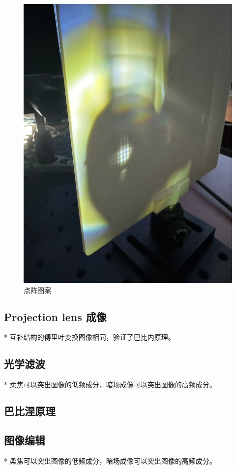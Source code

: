 \documentclass{ctexart}
\begin{document}
\begin{figure}[H]
\begin{minipage}[b]{0.2\textwidth}
    \includegraphics[width=\textwidth]{pictures/微信图片_20241010201031.jpg}
    \caption{点阵图案}
  \end{minipage}
\end{figure}
\subsection{Projection lens 成像}
* 互补结构的傅里叶变换图像相同，验证了巴比内原理。
\subsection{光学滤波}
* 柔焦可以突出图像的低频成分，暗场成像可以突出图像的高频成分。
\subsection{巴比涅原理}
\subsection{图像编辑}
* 柔焦可以突出图像的低频成分，暗场成像可以突出图像的高频成分。
\end{document}
